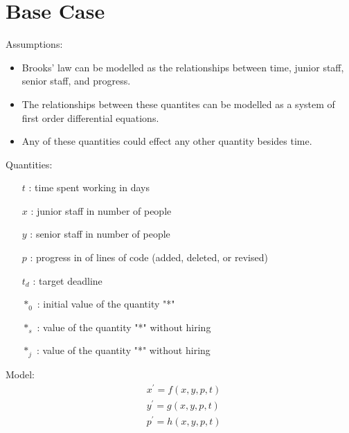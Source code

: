 \documentclass{article}
\newenvironment{atomize}
    {\begin{list} {} {
            \setlength\itemindent{0pt}
            \setlength\leftmargin{10pt}
            \setlength\labelwidth{0pt}
    }}
    {\end{list}}
\begin{document}
\section*{Base Case}
  \begin{atomize}
    \item Assumptions:
      \begin{itemize}
        \item Brooks' law can be modelled as the relationships between
        time, junior staff, senior staff, and progress.
        \item The relationships between these quantites can be modelled
        as a system of first order differential equations.
        \item Any of these quantities could effect any other quantity besides
        time.  
        \end{itemize}

    \item Quantities:
      \begin{itemize}
        \item [$t$]: time spent working in days
        \item [$x$]: junior staff in number of people
        \item [$y$]: senior staff in number of people
        \item [$p$]: progress in of lines of code (added, deleted, or revised)
        \item [$t_{d}$]: target deadline
        \item [$*_{0}$]: initial value of the quantity "*"
        \item [$*_{s}$]: value of the quantity "*" without hiring
        \item [$*_{j}$]: value of the quantity "*" without hiring
      \end{itemize}
  
    \item Model:
      \begin{align*}
        &x^{\prime} = f\left(x, y, p, t\right) \\[6pt]
        &y^{\prime} = g\left(x, y, p, t\right) \\[6pt]
        &p^{\prime} = h\left(x, y, p, t\right)
      \end{align*}
  \end{atomize}
\end{document}
